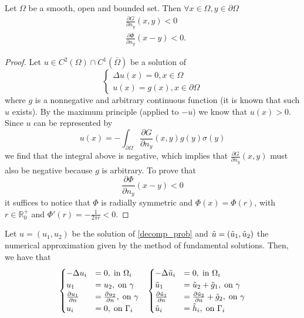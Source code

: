 \begin{lemma}\label{super_lemma}
    Let \(\Omega\) be a smooth, open and bounded set. Then \(\forall x \in \Omega, y \in \partial \Omega\)
    \begin{align*}
        &\frac{\partial G}{\partial n_y}(x, y) < 0\\ 
        &\frac{\partial \Phi}{\partial n_y}(x-y) < 0.
    \end{align*}
\end{lemma}
\begin{proof}
    Let \(u \in C^2(\Omega)\cap C^1(\overline{\Omega})\) be a solution of 
    \[
    \begin{cases}
        \Delta u(x) = 0, x \in \Omega\\
        u(x) = g(x), x \in \partial \Omega
    \end{cases}
    \]
    where \(g\) is a nonnegative and arbitrary continuous function (it is known that such \(u\) exists). By the maximum principle (applied to \(-u\)) we know that \(u(x) > 0\). Since \(u\) can be represented by
    \[
    u(x) = -\int_{\partial\Omega} \frac{\partial G}{\partial n_y}(x, y)g(y) \sigma(y)
    \]
    we find that the integral above is negative, which implies that \(\frac{\partial G}{\partial n_y}(x, y)\) must also be negative because \(g\) is arbitrary.
    To prove that
    \[
        \frac{\partial \Phi}{\partial n_y}(x-y) < 0    
    \]
    it suffices to notice that \(\Phi\) is radially symmetric and \(\Phi(x) = \Phi(r)\), with \(r \in \mathbb{R}_0^+\) and \(\Phi'(r) = -\frac{1}{2 \pi r} < 0\).
\end{proof}
Let \(u = (u_1, u_2)\) be the solution of \eqref{decomp_prob} and \(\Tilde{u} = (\Tilde{u}_1, \Tilde{u}_2)\) the numerical approximation given by the method of fundamental solutions. Then, we have that
\begin{align}
    \begin{split}
        \begin{cases}
            -\Delta u_i &= 0, \; \text{in }\Omega_i\\
            u_1 &= u_2, \; \text{on }\gamma\\
            \frac{\partial u_1}{\partial n} &= \frac{\partial u_2}{\partial n}, \; \text{on }\gamma\\
            u_i &= 0, \; \text{on }\Gamma_i
        \end{cases}
    \end{split}
    \quad
    \begin{split}
        \begin{cases}
            -\Delta \Tilde{u}_i &= 0, \; \text{in }\Omega_i\\
            \Tilde{u}_1 &= \Tilde{u}_2 + \Tilde{g}_1, \; \text{on }\gamma\\
            \frac{\partial \Tilde{u}_1}{\partial n} &= \frac{\partial \Tilde{u}_2}{\partial n} + \Tilde{g}_2, \; \text{on }\gamma\\
            \Tilde{u}_i &=  \Tilde{h}_i, \; \text{on }\Gamma_i
        \end{cases}
    \end{split}
\end{align}
